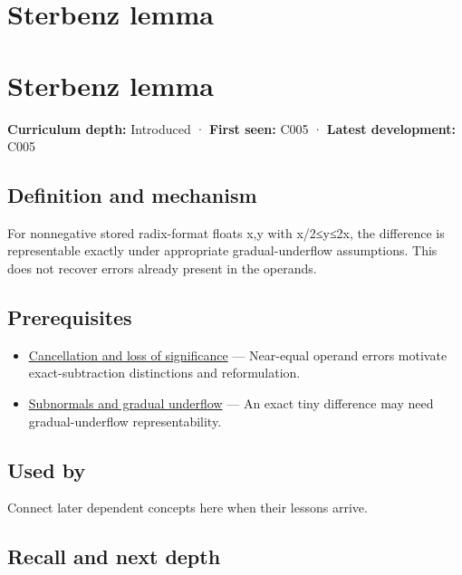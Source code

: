 \hypertarget{appendix-399b7ad53f39}{}
\section*{Sterbenz lemma}
\section{Sterbenz lemma}\label{appendix-399b7ad53f39-sterbenz-lemma}

\textbf{Curriculum depth:} Introduced · \textbf{First seen:} C005 · \textbf{Latest development:} C005

\subsection{Definition and mechanism}\label{appendix-399b7ad53f39-definition-and-mechanism}

For nonnegative stored radix-format floats x,y with x/2≤y≤2x, the difference is representable exactly under appropriate gradual-underflow assumptions. This does not recover errors already present in the operands.

\subsection{Prerequisites}\label{appendix-399b7ad53f39-prerequisites}

\begin{itemize}
\tightlist
\item
  \hyperref[appendix-a2773a6a2f9d]{Cancellation and loss of significance} --- Near-equal operand errors motivate exact-subtraction distinctions and reformulation.
\item
  \hyperref[appendix-00a6e044c437]{Subnormals and gradual underflow} --- An exact tiny difference may need gradual-underflow representability.
\end{itemize}

\subsection{Used by}\label{appendix-399b7ad53f39-used-by}

Connect later dependent concepts here when their lessons arrive.

\subsection{Recall and next depth}\label{appendix-399b7ad53f39-recall-and-next-depth}

